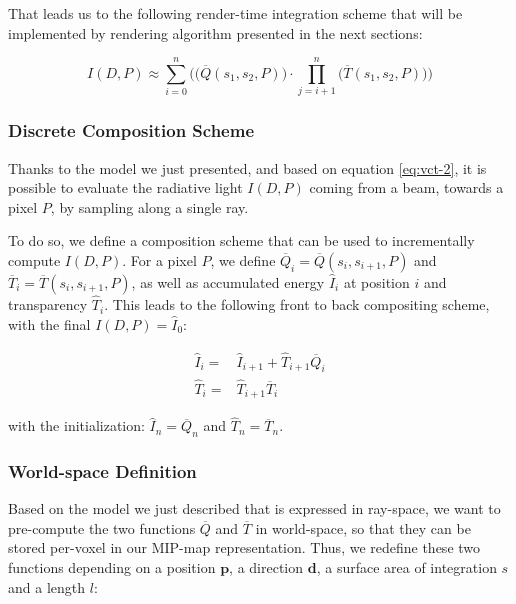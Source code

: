 That leads us to the following render-time integration scheme that will be implemented by rendering algorithm presented in the next sections:

\begin{equation}\label{eq:vct-2}
	I(D,P)\approx \sum^{n}_{i=0}\Bigg(\bigg( \overline{Q}(s_1,s_2,P)\bigg)\cdot\prod^{n}_{j=i+1}\bigg( \overline{T}(s_1,s_2,P)\bigg)\Bigg)
\end{equation}




\subsubsection{Discrete Composition Scheme}
Thanks to the model we just presented, and based on equation \ref{eq:vct-2}, it is possible to evaluate the radiative light $I(D,P)$ coming from a beam, towards a pixel $P$, by sampling along a single ray.

To do so, we define a composition scheme that can be used to incrementally compute $I(D,P)$. For a pixel $P$, we define $\overline{Q}_i=\overline{Q}(s_i,s_{i+1},P)$ and $\overline{T}_i=\overline{T}(s_i,s_{i+1},P)$, as well as accumulated energy $\hat{I}_i$ at position $i$ and transparency $\hat{T}_i$. This leads to the following front to back compositing scheme, with the final $I(D,P)=\hat{I}_0$:

\begin{equation*}
\begin{aligned}
	\hat{I}_i=&\hat{I}_{i+1}+\hat{T}_{i+1}\overline{Q}_i\\
	\hat{T}_i=&\hat{T}_{i+1}\overline{T}_i
\end{aligned}
\end{equation*}

with the initialization: $\hat{I}_n=\overline{Q}_n$ and $\hat{T}_n=\overline{T}_n$.




\subsubsection{World-space Definition}
Based on the model we just described that is expressed in ray-space, we want to pre-compute the two functions $\overline{Q}$ and $\overline{T}$ in world-space, so that they can be stored per-voxel in our MIP-map representation. Thus, we redefine these two functions depending on a position $\mathbf{p}$, a direction $\mathbf{d}$, a surface area of integration $s$ and a length $l$:

